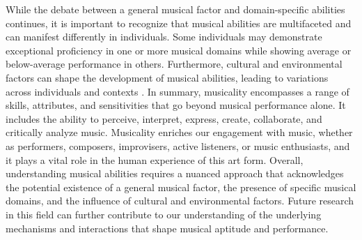 While the debate between a general musical factor and domain-specific abilities continues, it is important to recognize that musical abilities are multifaceted and can manifest differently in individuals. Some individuals may demonstrate exceptional proficiency in one or more musical domains while showing average or below-average performance in others. Furthermore, cultural and environmental factors can shape the development of musical abilities, leading to variations across individuals and contexts \cite{Pausch2022}.
In summary, musicality encompasses a range of skills, attributes, and sensitivities that go beyond musical performance alone. It includes the ability to perceive, interpret, express, create, collaborate, and critically analyze music. Musicality enriches our engagement with music, whether as performers, composers, improvisers, active listeners, or music enthusiasts, and it plays a vital role in the human experience of this art form. Overall, understanding musical abilities requires a nuanced approach that acknowledges the potential existence of a general musical factor, the presence of specific musical domains, and the influence of cultural and environmental factors. Future research in this field can further contribute to our understanding of the underlying mechanisms and interactions that shape musical aptitude and performance.





